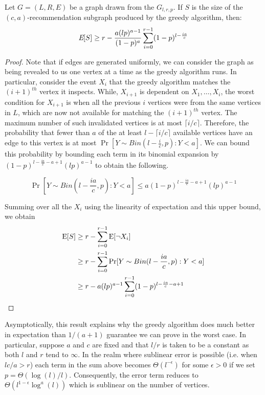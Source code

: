\begin{thm}
Let $G=(L,R,E)$ be a graph drawn from the $G_{l,r,p}$. If $S$ is the size of the $(c,a)$-recommendation subgraph produced by the greedy algorithm, then:
\[ \emph{\text{E}}[S] \geq r - \frac{a(lp)^{a-1}}{(1-p)^a} \sum_{i=0}^{r-1}(1-p)^{l-\frac{ia}{c}}\]
\end{thm}
\begin{proof}
Note that if edges are generated uniformly, we can consider the
graph as being revealed to us one vertex at a time as the greedy
algorithm runs. In particular, consider the event $X_i$ that the
greedy algorithm matches the $(i+1)^{th}$ vertex it inspects. While,
$X_{i+1}$ is dependent on $X_1,\ldots, X_i$, the worst condition for
$X_{i+1}$ is when all the previous $i$ vertices were from the same
vertices in $L$, which are now not available for matching the
$(i+1)^{th}$ vertex. The maximum number of such invalidated vertices
is at most $\lceil i/c \rceil$. Therefore, the probability that fewer
than $a$ of the at least $l-\lceil i/c \rceil $ available
vertices have an edge to this vertex is at most $\Pr[Y\sim Bin(l-\frac{i}{c},p): Y < a]$.
We can bound this probability by bounding each term in its binomial
expansion by $(1-p)^{l-\frac{ia}{c}-a+1}(lp)^{a-1}$ to obtain the following.

\[ \Pr[Y\sim Bin(l-\frac{ia}{c},p): Y < a] \leq a (1-p)^{l-\frac{ia}{c}-a+1}(lp)^{a-1}\]

Summing over all the $X_i$ using the linearity of expectation and this upper bound,
we obtain
\begin{align*}
      \text{E}[S]
&\geq r - \sum_{i=0}^{r-1} \text{E}[\lnot X_i] \\
&\geq r - \sum_{i=0}^{r-1} \Pr[Y \sim Bin(l-\frac{ia}{c},p): Y < a] \\
&\geq r - a(lp)^{a-1}\sum_{i=0}^{r-1}(1-p)^{l-\frac{ia}{c}-a+1}
\end{align*}
\end{proof}

Asymptotically, this result explains why the greedy
algorithm does much better in expectation than $1/(a+1)$ guarantee we
can prove in the worst case. In particular, suppose $a$ and $c$ are fixed and that
$l/r$ is taken to be a constant as both $l$ and $r$ tend to $\infty$. In the realm where sublinear error is possible (i.e. when $lc/a>r$) each term in the sum above becomes $\Theta(l^{-\epsilon})$ for some $\epsilon>0$ if we set $p=\Theta(\log(l)/l)$. Consequently, the error term reduces to $\Theta(l^{1-\epsilon}\log^a(l))$ which is sublinear on the number of vertices.

